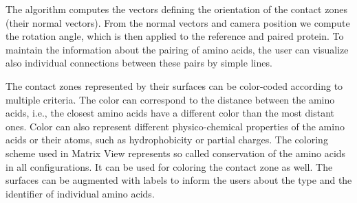 \documentclass[twocolumn]{bmcart}%
\def\ExpView {Exploded View\xspace}
\def\MatView {Matrix View\xspace}
\begin{document}
The algorithm computes the vectors defining the orientation of the contact zones (their normal vectors). 
From the normal vectors and camera position we compute the rotation angle, which is then applied to the reference and paired protein.
To maintain the information about the pairing of amino acids, the user can visualize also individual connections between these pairs by simple lines.


The contact zones represented by their surfaces can be color-coded according to multiple criteria.
The color can correspond to the distance between the amino acids, i.e., the closest amino acids have a different color than the most distant ones.
Color can also represent different physico-chemical properties of the amino acids or their atoms, such as hydrophobicity or partial charges.
The coloring scheme used in \MatView represents so called conservation of the amino acids in all configurations.
It can be used for coloring the contact zone as well.
The surfaces can be augmented with labels to inform the users about the type and the identifier of individual amino acids.
\end{document}

